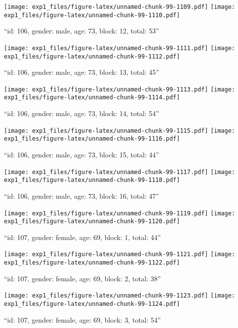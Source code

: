 \documentclass[,]{article}
\begin{document}
\texttt{[image: exp1\_files/figure-latex/unnamed-chunk-99-1109.pdf]}
\texttt{[image: exp1\_files/figure-latex/unnamed-chunk-99-1110.pdf]}

\newpage
[1] 

``id: 106, gender: male, age: 73, block: 12, total: 53''

\texttt{[image: exp1\_files/figure-latex/unnamed-chunk-99-1111.pdf]}
\texttt{[image: exp1\_files/figure-latex/unnamed-chunk-99-1112.pdf]}

\newpage
[1] 

``id: 106, gender: male, age: 73, block: 13, total: 45''

\texttt{[image: exp1\_files/figure-latex/unnamed-chunk-99-1113.pdf]}
\texttt{[image: exp1\_files/figure-latex/unnamed-chunk-99-1114.pdf]}

\newpage
[1] 

``id: 106, gender: male, age: 73, block: 14, total: 54''

\texttt{[image: exp1\_files/figure-latex/unnamed-chunk-99-1115.pdf]}
\texttt{[image: exp1\_files/figure-latex/unnamed-chunk-99-1116.pdf]}

\newpage
[1] 

``id: 106, gender: male, age: 73, block: 15, total: 44''

\texttt{[image: exp1\_files/figure-latex/unnamed-chunk-99-1117.pdf]}
\texttt{[image: exp1\_files/figure-latex/unnamed-chunk-99-1118.pdf]}

\newpage
[1] 

``id: 106, gender: male, age: 73, block: 16, total: 47''

\texttt{[image: exp1\_files/figure-latex/unnamed-chunk-99-1119.pdf]}
\texttt{[image: exp1\_files/figure-latex/unnamed-chunk-99-1120.pdf]}

\newpage
[1] 

``id: 107, gender: female, age: 69, block: 1, total: 44''

\texttt{[image: exp1\_files/figure-latex/unnamed-chunk-99-1121.pdf]}
\texttt{[image: exp1\_files/figure-latex/unnamed-chunk-99-1122.pdf]}

\newpage
[1] 

``id: 107, gender: female, age: 69, block: 2, total: 38''

\texttt{[image: exp1\_files/figure-latex/unnamed-chunk-99-1123.pdf]}
\texttt{[image: exp1\_files/figure-latex/unnamed-chunk-99-1124.pdf]}

\newpage
[1] 

``id: 107, gender: female, age: 69, block: 3, total: 54''
\end{document}
